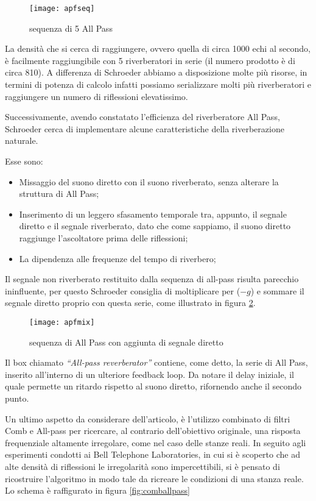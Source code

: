 \begin{figure}[htp]
\centering
\texttt{[image: apfseq]}
\caption{sequenza di 5 All Pass}
\label{fig:apfseq}
\end{figure}

La densità che si cerca di raggiungere, ovvero quella di circa 1000 echi al secondo, è facilmente raggiungibile con 5 riverberatori in serie (il numero prodotto è di circa 810). A differenza di Schroeder abbiamo a disposizione molte più risorse, in termini di potenza di calcolo infatti possiamo serializzare molti più riverberatori e raggiungere un numero di riflessioni elevatissimo.

Successivamente, avendo constatato l’efficienza del riverberatore All Pass, Schroeder cerca di implementare alcune caratteristiche della riverberazione naturale.

Esse sono:

\begin{itemize}
\item Missaggio del suono diretto con il suono riverberato, senza alterare la struttura di All Pass;
\item Inserimento di un leggero sfasamento temporale tra, appunto, il segnale diretto e il segnale riverberato, dato che come sappiamo, il suono diretto raggiunge l’ascoltatore prima delle riflessioni;
\item La dipendenza alle frequenze del tempo di riverbero;
\end{itemize}

Il segnale non riverberato restituito dalla sequenza di all-pass risulta parecchio ininfluente, per questo Schroeder consiglia di moltiplicare per ($-g$) e sommare il segnale diretto proprio con questa serie, come illustrato in figura \ref{fig:apfmix}.

\begin{figure}[htp]
\centering
\texttt{[image: apfmix]}
\caption{sequenza di All Pass con aggiunta di segnale diretto}
\label{fig:apfmix}
\end{figure}

Il box chiamato \emph{“All-pass reverberator”} contiene, come detto, la serie di All Pass, inserito all’interno di un ulteriore feedback loop.
Da notare il delay iniziale, il quale permette un ritardo rispetto al suono diretto, rifornendo anche il secondo punto.

\bigskip

Un ultimo aspetto da considerare dell’articolo,  è l’utilizzo combinato di filtri Comb e All-pass per ricercare, al contrario dell’obiettivo originale, una risposta frequenziale altamente irregolare, come nel caso delle stanze reali.
In seguito agli esperimenti condotti ai Bell Telephone Laboratories, in cui si è scoperto che ad alte densità di riflessioni le irregolarità sono impercettibili, si è pensato di ricostruire l’algoritmo in modo tale da ricreare le condizioni di una stanza reale.
Lo schema è raffigurato in figura \ref{fig:comballpass}
\smallskip

